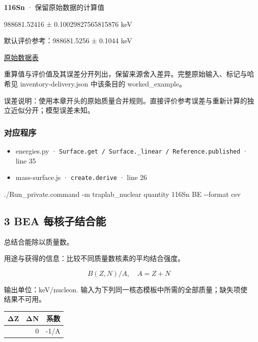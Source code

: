 \documentclass[
  11pt,
  letterpaper,
]{article}
\newenvironment{Shaded}{}{}
\newcommand{\AttributeTok}[1]{\textcolor[rgb]{0.49,0.56,0.16}{#1}}
\newcommand{\ExtensionTok}[1]{#1}
\newcommand{\NormalTok}[1]{#1}
\providecommand{\tightlist}{%
  \setlength{\itemsep}{0pt}\setlength{\parskip}{0pt}}
\begin{document}
\textbf{116Sn} · 保留原始数据的计算值

988681.52416 ± 0.10029827565815876 keV

默认评价参考：988681.5256 ± 0.1044 keV

\href{https://www-nds.iaea.org/amdc/ame2020/mass_1.mas20.txt}{原始数据表}

重算值与评价值及其误差分开列出，保留来源舍入差异。完整原始输入、标记与哈希见
inventory-delivery.json 中该条目的 worked\_example。

误差说明：使用本章开头的原始质量合并规则。直接评价参考误差与重新计算的独立近似分开；模型误差未知。

\subsubsection{对应程序}\label{ux5bf9ux5e94ux7a0bux5e8f-1}

\begin{itemize}
\tightlist
\item
  energies.py ·
  \texttt{Surface.get\ /\ Surface.\_linear\ /\ Reference.published} ·
  line 35
\item
  mass-surface.js · \texttt{create.derive} · line 26
\end{itemize}

\begin{Shaded}
\begin{Highlighting}[]
\ExtensionTok{./Run\_private.command} \AttributeTok{{-}m}\NormalTok{ traplab\_nuclear quantity 116Sn BE }\AttributeTok{{-}{-}format}\NormalTok{ csv}
\end{Highlighting}
\end{Shaded}

\subsection{3 BEA
每核子结合能}\label{bea-ux6bcfux6838ux5b50ux7ed3ux5408ux80fd}

总结合能除以质量数。

用途与获得的信息：比较不同质量数核素的平均结合强度。

\[
B(Z,N)/A,\quad A=Z+N
\]

输出单位：keV/nucleon.
输入为下列同一核态模板中所需的全部质量；缺失项使结果不可用。

\begin{longtable}[]{@{}rrr@{}}
\toprule\noalign{}
ΔZ & ΔN & 系数 \\
\midrule\noalign{}
\endhead
\bottomrule\noalign{}
\endlastfoot
0 & 0 & -1/A \\
\end{longtable}
\end{document}

